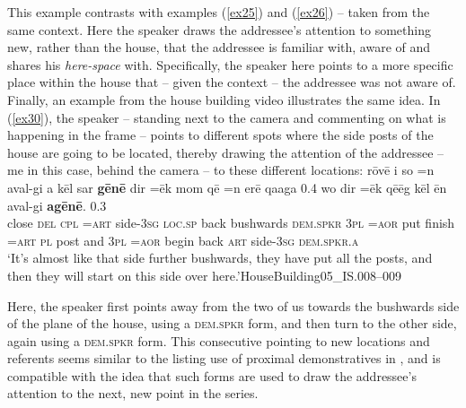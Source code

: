 \documentclass[output=paper
,modfonts
,nonflat]{langsci/langscibook}
\begin{document}
\noindent
This example contrasts with examples (\ref{ex25}) and (\ref{ex26}) -- taken from the same context. Here the speaker draws the addressee's attention to something new, rather than the house, that the addressee is familiar with, aware of and shares his \textit{here-space} with. Specifically, the speaker here points to a more specific place within the house that -- given the context -- the addressee was not aware of. Finally, an example from the house building video illustrates the same idea. In (\ref{ex30}), the speaker -- standing next to the camera and commenting on what is happening in the frame -- points to different spots where the side posts of the house are going to be located, thereby drawing the attention of the addressee -- me in this case, behind the camera -- to these different locations:
\ea\label{ex30}
\gll 	r\=ov{\textquotesingle}\=e	{\textquotesingle}i		so	=n	{\textquotesingle}aval-gi	a			k\=el	sar			\textbf{g\=en\=e}			dir	=\=ek		mom		q\=e		=n		{\textquotesingle}er\=e	qa{\textquotesingle}aga \hspace{2em}{\USOParen}0.4{\USCParen}\hspace{2em}			wo 	dir	=\=ek		q\=e{\textquotesingle}\=eg		k\=el	\=en		{\textquotesingle}aval-gi 	\textbf{ag\=en\=e}. {\USOParen}0.3{\USCParen}	\\
close	\textsc{del}	\textsc{cpl}	\textsc{=art}	side-\textsc{3sg}	\textsc{loc.sp}	back	bushwards	\textsc{dem.spkr}	\textsc{3pl}	\textsc{=aor}	put		finish	\textsc{=art}	\textsc{pl}	post {}	and	\textsc{3pl}	\textsc{=aor}	begin		back	\textsc{art}	side-\textsc{3sg}	\textsc{dem.spkr.a}\\
\glt `It’s almost like that side further bushwards, they have put all the posts, and then they will start on this side over here.'\hfill{HouseBuilding05\_IS.008--009}
\z

\noindent
Here, the speaker first points away from the two of us towards the bushwards side of the plane of the house, using a \textsc{dem.spkr} form, and then turn to the other side, again using a \textsc{dem.spkr} form. This consecutive pointing to new locations and referents seems similar to the listing use of proximal demonstratives in  \citep{Mosel2004}, and is compatible with the idea that such forms are used to draw the addressee's attention to the next, new point in the series.
\end{document}
